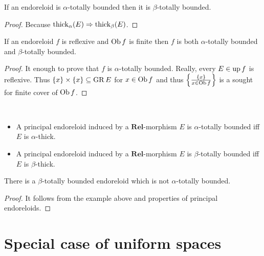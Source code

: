 \begin{prop}
If an endoreloid is $\alpha$-totally bounded then it is $\beta$-totally
bounded.\end{prop}
\begin{proof}
Because $\operatorname{thick}_{\alpha}(E)\Rightarrow\operatorname{thick}_{\beta}(E)$.\end{proof}
\begin{prop}
If an endoreloid $f$ is reflexive and $\operatorname{Ob} f$ is finite then $f$
is both $\alpha$-totally bounded and $\beta$-totally bounded.\end{prop}
\begin{proof}
It enough to prove that $f$ is $\alpha$-totally bounded. Really,
every $E\in\operatorname{up} f$ is reflexive. Thus $\{x\}\times\{x\}\subseteq\operatorname{GR} E$
for $x\in\operatorname{Ob} f$ and thus $\left\{ \frac{\{x\}}{x\in\operatorname{Ob} f}\right\}$ is a sought
for finite cover of $\operatorname{Ob} f$.\end{proof}
\begin{obvious}
~
\begin{itemize}
\item A principal endoreloid induced by a $\mathbf{Rel}$-morphism $E$ is
$\alpha$-totally bounded iff $E$ is $\alpha$-thick.
\item A principal endoreloid induced by a $\mathbf{Rel}$-morphism $E$ is
$\beta$-totally bounded iff $E$ is $\beta$-thick.
\end{itemize}
\end{obvious}
\begin{example}
There is a $\beta$-totally bounded endoreloid which is not $\alpha$-totally
bounded.\end{example}
\begin{proof}
It follows from the example above and properties of principal endoreloids.
\end{proof}

\section{Special case of uniform spaces}

